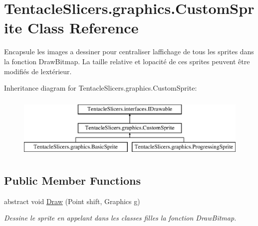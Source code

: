 \hypertarget{class_tentacle_slicers_1_1graphics_1_1_custom_sprite}{}\section{Tentacle\+Slicers.\+graphics.\+Custom\+Sprite Class Reference}
\label{class_tentacle_slicers_1_1graphics_1_1_custom_sprite}


Encapsule les images a dessiner pour centraliser l\textquotesingle{}affichage de tous les sprites dans la fonction Draw\+Bitmap. La taille relative et l\textquotesingle{}opacité de ces sprites peuvent être modifiés de l\textquotesingle{}extérieur.  


Inheritance diagram for Tentacle\+Slicers.\+graphics.\+Custom\+Sprite\+:\begin{figure}[H]
\begin{center}
\leavevmode
\includegraphics[height=3.000000cm]{class_tentacle_slicers_1_1graphics_1_1_custom_sprite}
\end{center}
\end{figure}
\subsection*{Public Member Functions}
\begin{DoxyCompactItemize}
\item 
abstract void \hyperlink{class_tentacle_slicers_1_1graphics_1_1_custom_sprite_a2a673911c8438b95e4f1f50f06ccaa41}{Draw} (Point shift, Graphics g)
\begin{DoxyCompactList}\small\item\em Dessine le sprite en appelant dans les classes filles la fonction Draw\+Bitmap. \end{DoxyCompactList}\end{DoxyCompactItemize}
